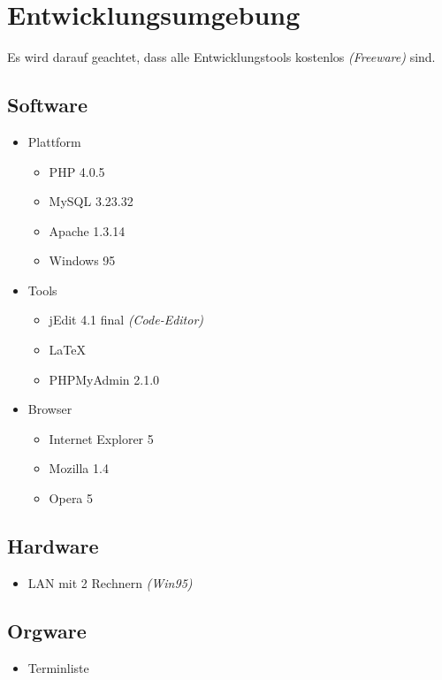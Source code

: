 \section{Entwicklungsumgebung}


Es wird darauf geachtet, dass alle Entwicklungstools kostenlos \textit{(Freeware)} sind.

\subsection{Software}

\begin{itemize}
  \item Plattform
    \begin{itemize}
      \item PHP 4.0.5
      \item MySQL 3.23.32
      \item Apache 1.3.14
      \item Windows 95
    \end{itemize}
  \item Tools
    \begin{itemize}
      \item jEdit 4.1 final \textit{(Code-Editor)}
      \item \LaTeX
      \item PHPMyAdmin 2.1.0
    \end{itemize}
  \item Browser
    \begin{itemize}
      \item Internet Explorer 5
      \item Mozilla 1.4
      \item Opera 5
    \end{itemize}
\end{itemize}

\subsection{Hardware}

\begin{itemize}
  \item LAN mit 2 Rechnern \textit{(Win95)}
\end{itemize}

\subsection{Orgware}

\begin{itemize}
  \item Terminliste
\end{itemize}
